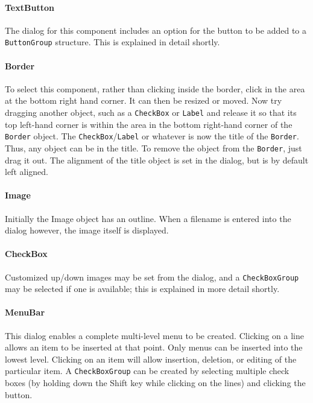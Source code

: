 \paragraph{TextButton}
The dialog for this component includes an option for the button to be
added to a \texttt{ButtonGroup} structure. This is explained in detail
shortly.

\paragraph{Border}
To select this component, rather than
clicking inside the border, click in the area at the bottom right hand
corner. It can then be resized or moved. Now try dragging another
object, such as a \texttt{CheckBox} or \texttt{Label} and release it so
that its top left-hand corner is within the area in the bottom
right-hand corner of the \texttt{Border} object. The
\texttt{CheckBox}/\texttt{Label} or whatever is now the title of the
\texttt{Border}. Thus, any object can be in the title. To remove the
object from the \texttt{Border}, just drag it out. The alignment of the
title object is set in the dialog, but is by default left aligned.

\paragraph{Image}
Initially the Image object has an outline. When a filename is entered
into the dialog however, the image itself is displayed.

\paragraph{CheckBox}
Customized up/down images may be set from the dialog, and a
\texttt{CheckBoxGroup} may be selected if one is available; this is
explained in more detail shortly.

\paragraph{MenuBar}
This dialog enables a complete multi-level menu to be
created. Clicking on a line allows an item to be inserted at that
point. Only menus can be inserted into the lowest level.
Clicking on an item will allow insertion, deletion, or editing of the
particular item. A \texttt{CheckBoxGroup} can be created by selecting
multiple check boxes (by holding down the Shift key while clicking on
the lines) and clicking the button.

